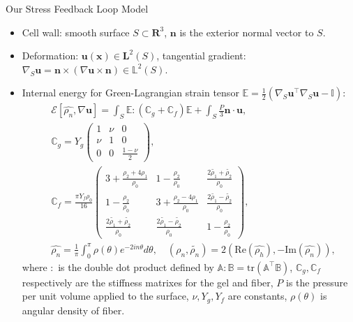 \documentclass[9pt,UTF8,aspectratio=43]{beamer}
\begin{document}
\begin{frame}{Our Stress Feedback Loop Model}
\begin{itemize}
\item Cell wall: smooth surface $S \subset \mathbf{R}^{3} $, $\bm{n}$ is the exterior normal vector to $S$.
\item Deformation: $\bm{u}(\bm{x}) \in \bm{L}^{2} (S)$, tangential gradient: $\nabla_{S} \bm{u} = \bm{n} \times (\nabla \bm{u} \times \bm{n}) \in \mathbb{L}^{2} (S)$.
\item Internal energy for Green-Lagrangian strain tensor $\mathbb{E} = \frac{1}{ 2 } \left(\nabla_{S}\bm{u}^{\top} \nabla_{S}  \bm{u} - \mathbb{I}\right)$: 
\begin{align}
& \mathcal{E}\left[\widehat{\rho_{n} },\nabla \bm{u}\right] = \int_S \mathbb{E} : \left(\mathbb{C}_{g} + \mathbb{C}_{f}  \right)\mathbb{E} +  \int_{S} \frac{ P }{ 3 } \bm{n} \cdot \bm{u}, \\ 
& \mathbb{C}_{g} = Y_{g} \left(
\begin{array}{ccc}
  1 & \nu & 0 \\
  \nu & 1 & 0 \\
  0 & 0 & \frac{ 1-\nu }{ 2 } 
\end{array}
\right), \\
& \mathbb{C}_{f} = \frac{ \pi Y_{f} \rho_0 }{ 16 } \left(
\begin{array}{ccc}
  3 + \frac{ \rho_2 + 4 \rho_1 }{\rho_0 } & 1- \frac{ \rho_2 }{  \rho_0 } & \frac{ 2\widetilde{\rho_1} + \widetilde{\rho_2}}{\rho_0  }  \\
  1- \frac{ \rho_2 }{  \rho_0 } &  3 + \frac{ \rho_2 - 4 \rho_1 }{\rho_0 } & \frac{ 2\widetilde{\rho_1} - \widetilde{\rho_2}}{\rho_0  }  \\
  \frac{ 2\widetilde{\rho_1} + \widetilde{\rho_2}}{\rho_0  }  & \frac{ 2\widetilde{\rho_1} - \widetilde{\rho_2}}{\rho_0  } &   1- \frac{ \rho_2 }{  \rho_0 } 
\end{array}
\right), \\
& \widehat{\rho_{n}} = \frac{1}{ \pi } \int_{0} ^{\pi} \rho(\theta) e^{-2in\theta} d\theta, \quad 
\left(\rho_{n} , \widetilde{\rho_{n} }\right) = 2 \left( \text{Re} \left(\widehat{\rho_{h} }\right), - \text{Im} \left( \widehat{\rho_{n} }\right)\right),
\end{align}
where $:$ is the double dot product defined by $\mathbb{A}:\mathbb{B} = \text{tr}(\mathbb{A}^{\top} \mathbb{B})$, $\mathbb{C}_{g} , \mathbb{C}_{f} $ respectively are the stiffness matrixes for the gel and fiber, $P$ is the pressure per unit volume applied to the surface, $\nu,Y_{g} , Y_{f} $ are constants, $\rho(\theta)$ is angular density of fiber.
\end{itemize}
\end{frame}
\end{document}
